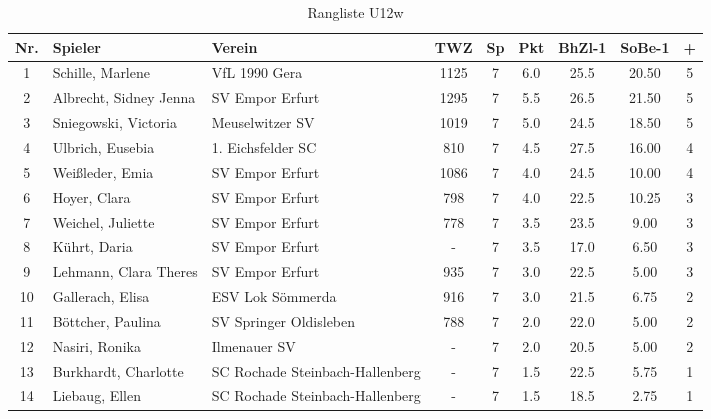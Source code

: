 \begin{table}[H]
\centering
\begin{tabular}{|c|l|l|c|c|c|c|c|c|}
\hline
Nr. & Spieler & Verein & TWZ & Sp & Pkt & BhZl-1 & SoBe-1 & + \\ \hline
1 & Schille, Marlene & VfL 1990 Gera & 1125 & 7 & 6.0 & 25.5 & 20.50 & 5 \\
2 & Albrecht, Sidney Jenna & SV Empor Erfurt & 1295 & 7 & 5.5 & 26.5 & 21.50 & 5 \\
3 & Sniegowski, Victoria & Meuselwitzer SV & 1019 & 7 & 5.0 & 24.5 & 18.50 & 5 \\
4 & Ulbrich, Eusebia & 1. Eichsfelder SC & 810 & 7 & 4.5 & 27.5 & 16.00 & 4 \\
5 & Weißleder, Emia & SV Empor Erfurt & 1086 & 7 & 4.0 & 24.5 & 10.00 & 4 \\
6 & Hoyer, Clara & SV Empor Erfurt & 798 & 7 & 4.0 & 22.5 & 10.25 & 3 \\
7 & Weichel, Juliette & SV Empor Erfurt & 778 & 7 & 3.5 & 23.5 & 9.00 & 3 \\
8 & Kührt, Daria & SV Empor Erfurt & - & 7 & 3.5 & 17.0 & 6.50 & 3 \\
9 & Lehmann, Clara Theres & SV Empor Erfurt & 935 & 7 & 3.0 & 22.5 & 5.00 & 3 \\
10 & Gallerach, Elisa & ESV Lok Sömmerda & 916 & 7 & 3.0 & 21.5 & 6.75 & 2 \\
11 & Böttcher, Paulina & SV Springer Oldisleben & 788 & 7 & 2.0 & 22.0 & 5.00 & 2 \\
12 & Nasiri, Ronika & Ilmenauer SV & - & 7 & 2.0 & 20.5 & 5.00 & 2 \\
13 & Burkhardt, Charlotte & SC Rochade Steinbach-Hallenberg & - & 7 & 1.5 & 22.5 & 5.75 & 1 \\
14 & Liebaug, Ellen & SC Rochade Steinbach-Hallenberg & - & 7 & 1.5 & 18.5 & 2.75 & 1 \\ \hline
\end{tabular}
\caption{Rangliste U12w}
\label{tab:Rangliste_U10w}
\end{table}
